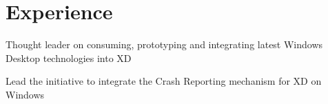 \documentclass[letterpaper]{deedy-resume} %
\begin{document}
\begin{minipage}[t]{0.66\textwidth} %

\section{Experience}


\vspace{\topsep} %
\begin{tightitemize}
\item Thought leader on consuming, prototyping and integrating latest Windows Desktop technologies into XD
\item Lead the initiative to integrate the Crash Reporting mechanism for XD on Windows
\end{tightitemize}

\sectionspace %




\end{minipage}
\end{document}

